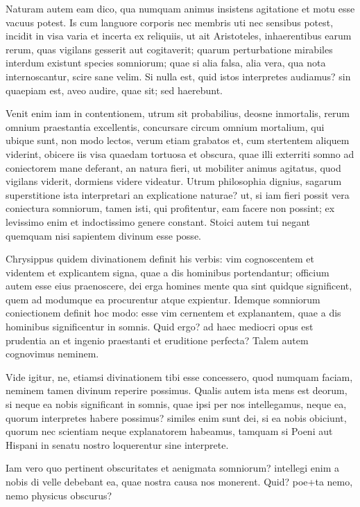  Naturam autem eam dico, qua numquam animus insistens agitatione et motu esse vacuus potest. Is cum languore corporis nec membris uti nec sensibus potest, incidit in visa varia et incerta ex reliquiis, ut ait Aristoteles, inhaerentibus earum rerum, quas vigilans gesserit aut cogitaverit; quarum perturbatione mirabiles interdum existunt species somniorum; quae si alia falsa, alia vera, qua nota internoscantur, scire sane velim. Si nulla est, quid istos interpretes audiamus? sin quaepiam est, aveo audire, quae sit; sed haerebunt.

 Venit enim iam in contentionem, utrum sit probabilius, deosne inmortalis, rerum omnium praestantia excellentis, concursare circum omnium mortalium, qui ubique sunt, non modo lectos, verum etiam grabatos et, cum stertentem aliquem viderint, obicere iis visa quaedam tortuosa et obscura, quae illi exterriti somno ad coniectorem mane deferant, an natura fieri, ut mobiliter animus agitatus, quod vigilans viderit, dormiens videre videatur. Utrum philosophia dignius, sagarum superstitione ista interpretari an explicatione naturae? ut, si iam fieri possit vera coniectura somniorum, tamen isti, qui profitentur, eam facere non possint; ex levissimo enim et indoctissimo genere constant. Stoici autem tui negant quemquam nisi sapientem divinum esse posse.

 Chrysippus quidem divinationem definit his verbis: vim cognoscentem et videntem et explicantem signa, quae a dis hominibus portendantur; officium autem esse eius praenoscere, dei erga homines mente qua sint quidque significent, quem ad modumque ea procurentur atque expientur. Idemque somniorum coniectionem definit hoc modo: esse vim cernentem et explanantem, quae a dis hominibus significentur in somnis. Quid ergo? ad haec mediocri opus est prudentia an et ingenio praestanti et eruditione perfecta? Talem autem cognovimus neminem.

 Vide igitur, ne, etiamsi divinationem tibi esse concessero, quod numquam faciam, neminem tamen divinum reperire possimus. Qualis autem ista mens est deorum, si neque ea nobis significant in somnis, quae ipsi per nos intellegamus, neque ea, quorum interpretes habere possimus? similes enim sunt dei, si ea nobis obiciunt, quorum nec scientiam neque explanatorem habeamus, tamquam si Poeni aut Hispani in senatu nostro loquerentur sine interprete.

 Iam vero quo pertinent obscuritates et aenigmata somniorum? intellegi enim a nobis di velle debebant ea, quae nostra causa nos monerent. Quid? poe+ta nemo, nemo physicus obscurus?


